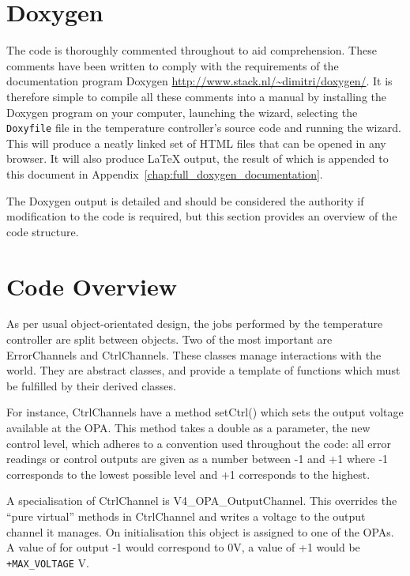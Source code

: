 \documentclass[11pt]{report}
\begin{document}
\section{Doxygen} %
\label{sub:doxygen}

The code is thoroughly commented throughout to aid comprehension. These comments have been written to comply with the requirements of the documentation program Doxygen \url{http://www.stack.nl/~dimitri/doxygen/}. It is therefore simple to compile all these comments into a manual by installing the Doxygen program on your computer, launching the wizard, selecting the {\tt Doxyfile} file in the temperature controller's source code and running the wizard. This will produce a neatly linked set of HTML files that can be opened in any browser. It will also produce \LaTeX{} output, the result of which is appended to this document in Appendix~\ref{chap:full_doxygen_documentation}. 

The Doxygen output is detailed and should be considered the authority if modification to the code is required, but this section provides an overview of the code structure. 


\section{Code Overview} %
\label{sub:code_overview}

As per usual object-orientated design, the jobs performed by the temperature controller are split between objects. Two of the most important are ErrorChannels and CtrlChannels. These classes manage interactions with the world. They are abstract classes, and provide a template of functions which must be fulfilled by their derived classes. 

For instance, CtrlChannels have a method setCtrl() which sets the output voltage available at the OPA. This method takes a double as a parameter, the new control level, which adheres to a convention used throughout the code: all error readings or control outputs are given as a number between -1 and +1 where -1 corresponds to the lowest possible level and +1 corresponds to the highest. 

A specialisation of CtrlChannel is V4\_OPA\_OutputChannel. This overrides the ``pure virtual'' methods in CtrlChannel and writes a voltage to the output channel it manages. On initialisation this object is assigned to one of the OPAs. A value of for output -1 would correspond to 0V, a value of +1 would be {\tt +MAX\_VOLTAGE} V. 
\end{document}
